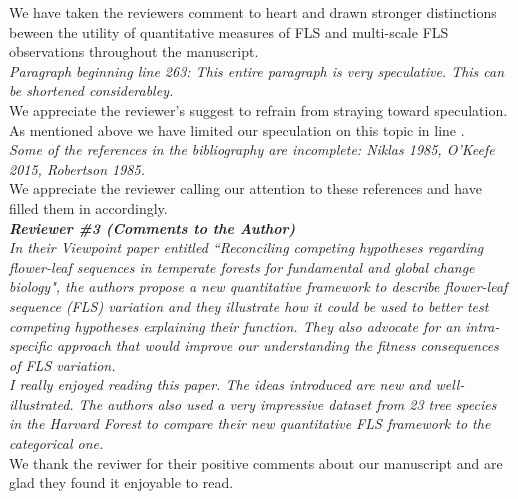 \documentclass{article}[11pt]
\begin{document}
{\noindent We have taken the reviewers comment to heart and drawn stronger distinctions beween the utility of quantitative measures of FLS and multi-scale FLS observations throughout the manuscript.\\ 

\emph{Paragraph beginning line 263: This entire paragraph is very speculative. This can be shortened considerabley.}\\

\noindent We appreciate the reviewer's suggest to refrain from straying toward speculation. As mentioned above we have limited our speculation on this topic in line . \\

\emph{Some of the references in the bibliography are incomplete: Niklas 1985, O'Keefe 2015,  Robertson 1985.}\\
 
\noindent We appreciate the reviewer calling our attention to these references and have filled them in accordingly.\\

\emph{{\bf Reviewer \#3 (Comments to the Author)}}\\
\emph{In their Viewpoint paper entitled ``Reconciling competing hypotheses regarding flower-leaf sequences in temperate forests for fundamental and global change biology", the authors propose a new quantitative framework to describe flower-leaf sequence (FLS) variation and they illustrate how it could be used to better test competing hypotheses explaining their function. They also advocate for an intra-specific approach that would improve our understanding the fitness consequences of FLS variation.\\
I really enjoyed reading this paper. The ideas introduced are new and well-illustrated. The authors also used a very impressive dataset from 23 tree species in the Harvard Forest to compare their new quantitative FLS framework to the categorical one.}\\

\noindent We thank the reviwer for their positive comments about our manuscript and are glad they found it enjoyable to read.\\

}
\end{document}
